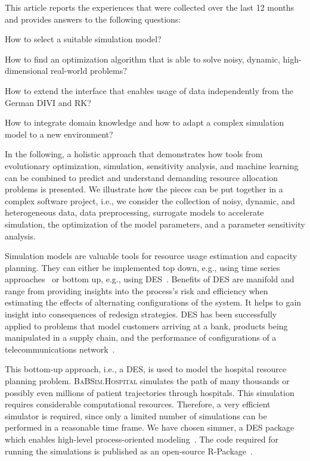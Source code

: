 \documentclass[conference]{IEEEtran}
\newcommand{\babsimhospital}{\textsc{BaBSim.Hospital}\xspace}
\begin{document}
This article reports the experiences that were collected over the last 12 months and provides answers to the following questions:
\begin{compactenum}[(Q-1)]
\item How to select a suitable simulation model?
\item How to find an optimization algorithm that is able to solve noisy, dynamic, high-dimensional real-world problems?
\item How to extend the interface  that enables  usage  of  data  independently  from  the German DIVI  and  RK?
\item How to integrate domain knowledge and how to adapt a complex simulation model to a new environment?
\end{compactenum}
In the following, a holistic approach that demonstrates how tools from evolutionary optimization, simulation, sensitivity analysis, and machine learning can be combined to predict and understand demanding resource allocation problems is presented.
We illustrate how the pieces can be put together in a complex software project, i.e., we consider the collection of noisy, dynamic, and heterogeneous data, data preprocessing, surrogate models to accelerate simulation, the optimization of the model parameters, and a parameter sensitivity analysis.

Simulation models are valuable tools for resource usage estimation and capacity planning.
They can either be implemented top down, e.g., using time series approaches~\cite{Hynd08b} or bottom up, e.g., using \gls{DES}~\cite{Bank01a}.
Benefits of \gls{DES} are manifold and range from providing insights into the process’s risk and efficiency when estimating the effects of alternating configurations of the system.
It helps to gain insight into consequences of redesign strategies.
\gls{DES} has been successfully applied to problems that model customers arriving at a bank,   
products being manipulated in a supply chain, and the performance of configurations of a telecommunications network~\cite{Bank01a}.

This bottom-up approach, i.e., a \gls{DES}, is used to model the hospital resource planning problem.
\babsimhospital simulates the path of many thousands or possibly even millions of patient trajectories through hospitals.
This simulation requires considerable computational resources.
Therefore, a very efficient simulator is required, since only a limited number of simulations can be performed in a reasonable time frame.
We have chosen \gls{simmer}, a \gls{DES} package which enables high-level process-oriented modeling~\citep{Ucar19a}. 
The code required for running the simulations is published as an open-source R-Package~\citep{bart20rArxiv, bart20t}.
\end{document}
